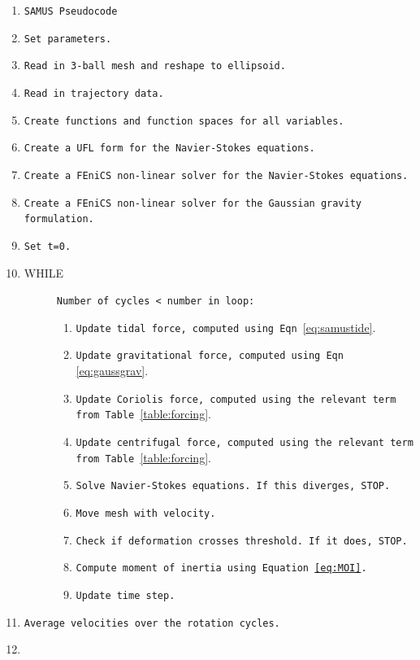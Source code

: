 \documentclass[twocolumn,doublespacing]{aastex631}
\begin{document}
\begin{enumerate}
\itemsep0em
    \item[]\texttt{SAMUS Pseudocode}
    \item\texttt{Set parameters. }
    \item\texttt{Read in 3-ball mesh and reshape to ellipsoid.}
    \item\texttt{Read in trajectory data.}
    \item\texttt{Create functions and function spaces for all variables.}
    \item\texttt{Create a UFL form for the Navier-Stokes equations.}
    \item\texttt{Create a FEniCS non-linear solver for the Navier-Stokes equations.}
    \item\texttt{Create a FEniCS non-linear solver for the Gaussian gravity formulation.}
    \item\texttt{Set t=0.}
    \item\begin{description}
            \item[WHILE]\verb|Number of cycles < number in loop:|
            \begin{enumerate}
                \item\texttt{Update tidal force, computed using Eqn }\ref{eq:samustide}.
                \item\texttt{Update gravitational force, computed using Eqn }\ref{eq:gaussgrav}.
                \item\texttt{Update Coriolis force, computed using the relevant term from Table }\ref{table:forcing}.
                \item\texttt{Update centrifugal force, computed using the relevant term from Table }\ref{table:forcing}.
                \item\texttt{Solve Navier-Stokes equations. If this diverges, STOP.}
		\item\texttt{Move mesh with velocity.}
                \item\texttt{Check if deformation crosses threshold. If it does, STOP.}
		\item\texttt{Compute moment of inertia using Equation \ref{eq:MOI}.}
		\item\texttt{Update time step.}
            \end{enumerate}
	\end{description}
    \item\texttt{Average velocities over the rotation cycles.}
    \item\begin{description}

\end{description}
\end{enumerate}
\end{document}
